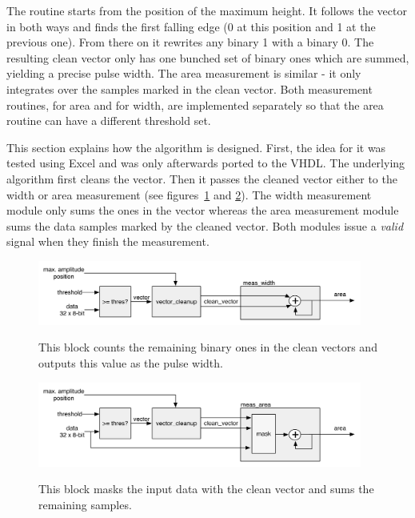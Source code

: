 The routine starts from the position of the maximum height. It follows the vector in both ways and finds the first falling edge (0 at this position and 1 at the previous one). From there on it rewrites any binary 1 with a binary 0. The resulting clean vector only has one bunched set of binary ones which are summed, yielding a precise pulse width. The area measurement is similar - it only integrates over the samples marked in the clean vector. Both measurement routines, for area and for width, are implemented separately so that the area routine can have a different threshold set.

This section explains how the algorithm is designed. First, the idea for it was tested using Excel and was only afterwards ported to the VHDL. The underlying algorithm first cleans the vector. Then it passes the cleaned vector either to the width or area measurement (see figures~\ref{fig:width} and \ref{fig:area}). The width measurement module only sums the ones in the vector whereas the area measurement module sums the data samples marked by the cleaned vector. Both modules issue a \emph{valid} signal when they finish the measurement.

\begin{figure}[!t]
\centering
\includegraphics[width=0.95\textwidth]{05_current_monitoring/plots/width2}  \label{fig:width}
\caption{This block counts the remaining binary ones in the clean vectors and outputs this value as the pulse width.}
\end{figure}


\begin{figure}[!t]
\centering\includegraphics[width=0.95\textwidth]{05_current_monitoring/plots/area2}  \label{fig:area}
\caption{This block masks the input data with the clean vector and sums the remaining samples.}
\end{figure}



